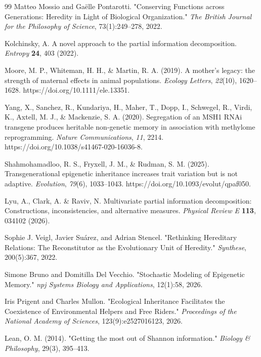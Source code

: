 \documentclass[pdflatex,sn-mathphys-num]{sn-jnl}
\theoremstyle{thmstylethree}
\theoremstyle{thmstyleone}
\begin{document}
\begin{thebibliography}{99}
Matteo Mossio and Ga\"{e}lle Pontarotti.
"Conserving Functions across Generations: Heredity in Light of Biological Organization."
\textit{The British Journal for the Philosophy of Science},
73(1):249--278, 2022.

Kolchinsky, A.
A novel approach to the partial information decomposition.
\textit{Entropy} \textbf{24}, 403 (2022).

Moore, M. P., Whiteman, H. H., \& Martin, R. A. (2019).
A mother's legacy: the strength of maternal effects in animal populations.
\textit{Ecology Letters}, \textit{22}(10), 1620--1628.
https://doi.org/10.1111/ele.13351.

Yang, X., Sanchez, R., Kundariya, H., Maher, T., Dopp, I., Schwegel, R., Virdi, K., Axtell, M. J., \& Mackenzie, S. A. (2020).
Segregation of an MSH1 RNAi transgene produces heritable non-genetic memory in association with methylome reprogramming.
\textit{Nature Communications}, \textit{11}, 2214.
https://doi.org/10.1038/s41467-020-16036-8.

Shahmohamadloo, R. S., Fryxell, J. M., \& Rudman, S. M. (2025).
Transgenerational epigenetic inheritance increases trait variation but is not adaptive.
\textit{Evolution}, \textit{79}(6), 1033--1043.
https://doi.org/10.1093/evolut/qpaf050.

Lyu, A., Clark, A. \& Raviv, N.
Multivariate partial information decomposition: Constructions, inconsistencies, and alternative measures.
\textit{Physical Review E} \textbf{113}, 034102 (2026).

Sophie J. Veigl, Javier Su\'arez, and Adrian Stencel.
"Rethinking Hereditary Relations: The Reconstitutor as the Evolutionary Unit of Heredity."
\textit{Synthese}, 200(5):367, 2022.

Simone Bruno and Domitilla Del Vecchio.
"Stochastic Modeling of Epigenetic Memory."
\textit{npj Systems Biology and Applications}, 12(1):58, 2026.

Iris Prigent and Charles Mullon.
"Ecological Inheritance Facilitates the Coexistence of Environmental Helpers and Free Riders."
\textit{Proceedings of the National Academy of Sciences},
123(9):e2527016123, 2026.

Lean, O. M. (2014).
"Getting the most out of Shannon information."
\textit{Biology \& Philosophy}, 29(3), 395--413.


\end{thebibliography}
\end{document}
